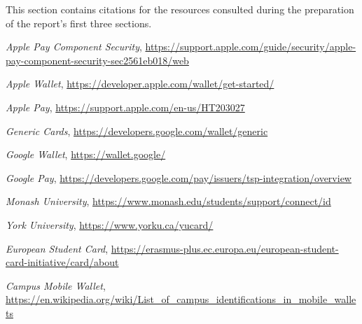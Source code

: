 \documentclass[10pt]{article}
\begin{document}
\begin{thebibliography}{9}

\item[]This section contains citations for the resources consulted during the preparation of the report's first three sections.

  \textit{Apple Pay Component Security},
  \url{https://support.apple.com/guide/security/apple-pay-component-security-sec2561eb018/web}

  \textit{Apple Wallet},
  \url{https://developer.apple.com/wallet/get-started/}

  \textit{Apple Pay},
  \url{https://support.apple.com/en-us/HT203027}

  \textit{Generic Cards},
  \url{https://developers.google.com/wallet/generic}

  \textit{Google Wallet},
  \url{https://wallet.google/}

  \textit{Google Pay},
  \url{https://developers.google.com/pay/issuers/tsp-integration/overview}

  \textit{Monash University},
  \url{https://www.monash.edu/students/support/connect/id}

  \textit{York University},
  \url{https://www.yorku.ca/yucard/}

  \textit{European Student Card},
  \url{https://erasmus-plus.ec.europa.eu/european-student-card-initiative/card/about}

  \textit{Campus Mobile Wallet},
  \url{https://en.wikipedia.org/wiki/List_of_campus_identifications_in_mobile_wallets}

\end{thebibliography}
\end{document}
